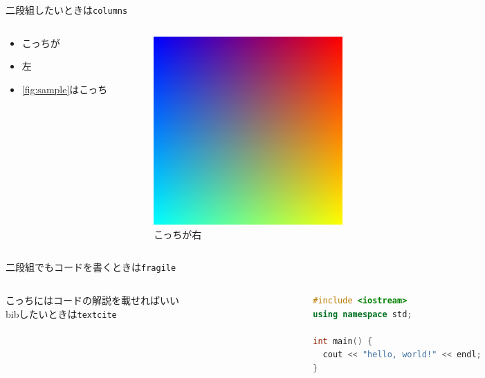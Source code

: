 \documentclass[unicode,12pt]{beamer}
\begin{document}
\begin{frame}{二段組したいときは\texttt{columns}}
  \begin{columns}[t]
    \begin{column}{0.5\textwidth}
      \begin{itemize}
      \item こっちが
      \item 左
      \item \autoref{fig:sample}はこっち
      \end{itemize}
    \end{column}
    \begin{column}{0.5\textwidth}
      \begin{figure}[htbp]
        \centering
        \includegraphics[width=0.45\textwidth]{sample.png}
        \caption{こっちが右}
        \label{fig:sample}
      \end{figure}
    \end{column}
  \end{columns}
\end{frame}

\begin{frame}[fragile]{二段組でもコードを書くときは\texttt{fragile}}
  \begin{columns}[t]
    \begin{column}{0.4\textwidth}
      こっちにはコードの解説を載せればいい\\
      bibしたいときは\texttt{textcite}
      \textcite{lourencco2018structured}\\
      \textcite{lourencco2016unveiling}
    \end{column}
    \begin{column}{0.6\textwidth}
      \begin{lstlisting}[language=c++,caption=C++のサンプルコード,label=code:cpp]
#include <iostream>
using namespace std;

int main() {
  cout << "hello, world!" << endl;
}
      \end{lstlisting}
    \end{column}
  \end{columns}
\end{frame}

\begin{frame}[allowframebreaks]
  \scriptsize
  \printbibliography
\end{frame}
\end{document}
